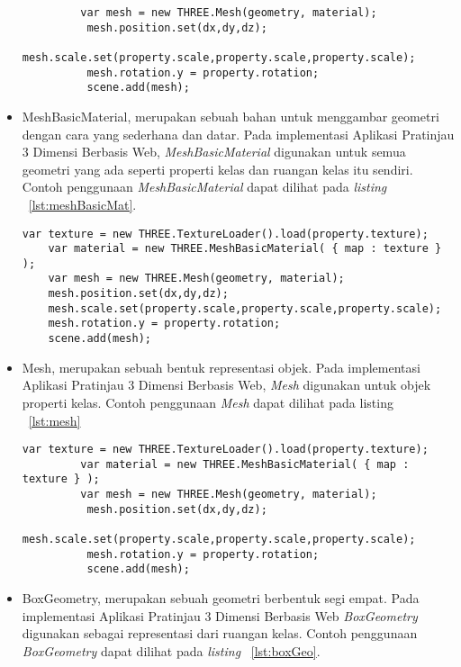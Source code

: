 \begin{itemize}
\begin{lstlisting}
         var mesh = new THREE.Mesh(geometry, material);
          mesh.position.set(dx,dy,dz);
          mesh.scale.set(property.scale,property.scale,property.scale);
          mesh.rotation.y = property.rotation;
          scene.add(mesh);
\end{lstlisting}
	\item MeshBasicMaterial, merupakan sebuah bahan untuk menggambar geometri dengan cara yang sederhana dan datar. Pada implementasi Aplikasi Pratinjau 3 Dimensi Berbasis Web, {\it MeshBasicMaterial} digunakan untuk semua geometri yang ada seperti properti kelas dan ruangan kelas itu sendiri. Contoh penggunaan {\it MeshBasicMaterial} dapat dilihat pada {\it listing} ~\ref{lst:meshBasicMat}.
\begin{lstlisting}[caption={Contoh penggunaan {\it MeshBasicMaterial} untuk suatu {\it mesh} yang akan ditambahkan ke {\it Scene} pada implementasi Aplikasi Pratinjau 3 Dimensi Berbasis Web}, label={lst:meshBasicMat},captionpos=b]
	var texture = new THREE.TextureLoader().load(property.texture);
	var material = new THREE.MeshBasicMaterial( { map : texture } ); 
	var mesh = new THREE.Mesh(geometry, material);
	mesh.position.set(dx,dy,dz);
	mesh.scale.set(property.scale,property.scale,property.scale);
	mesh.rotation.y = property.rotation;
	scene.add(mesh);
\end{lstlisting}
	\item Mesh, merupakan sebuah bentuk representasi objek. Pada implementasi Aplikasi Pratinjau 3 Dimensi Berbasis Web, {\it Mesh} digunakan untuk objek properti kelas. Contoh penggunaan {\it Mesh} dapat dilihat pada listing ~\ref{lst:mesh}
\begin{lstlisting}[caption={Contoh penggunaan {\it Mesh} yang akan ditambahkan ke {\it Scene} pada implementasi Aplikasi Pratinjau 3 Dimensi Berbasis Web}, label={lst:mesh},captionpos=b]
  	var texture = new THREE.TextureLoader().load(property.texture);
         var material = new THREE.MeshBasicMaterial( { map : texture } ); 
         var mesh = new THREE.Mesh(geometry, material);
          mesh.position.set(dx,dy,dz);
          mesh.scale.set(property.scale,property.scale,property.scale);
          mesh.rotation.y = property.rotation;
          scene.add(mesh);
\end{lstlisting}
	\item BoxGeometry, merupakan sebuah geometri berbentuk segi empat. Pada implementasi Aplikasi Pratinjau 3 Dimensi Berbasis Web {\it BoxGeometry} digunakan sebagai representasi dari ruangan kelas. Contoh penggunaan {\it BoxGeometry} dapat dilihat pada {\it listing} ~\ref{lst:boxGeo}.

\end{itemize}
